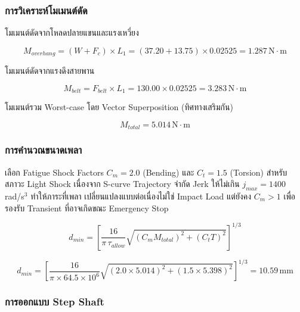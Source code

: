 \subsubsection{การวิเคราะห์โมเมนต์ดัด}

โมเมนต์ดัดจากโหลดปลายแขนและแรงเหวี่ยง

\begin{equation}
  M_{overhang} = (W + F_c) \times L_1
               = (37.20 + 13.75) \times 0.02525
               = 1.287\,\text{N}\cdot\text{m}
  \label{eq:shaft_m_overhang}
\end{equation}

โมเมนต์ดัดจากแรงดึงสายพาน

\begin{equation}
  M_{belt} = F_{belt} \times L_1
           = 130.00 \times 0.02525
           = 3.283\,\text{N}\cdot\text{m}
  \label{eq:shaft_m_belt}
\end{equation}

โมเมนต์รวม Worst-case โดย Vector Superposition (ทิศทางเสริมกัน)

\begin{equation}
  M_{total} = 5.014\,\text{N}\cdot\text{m}
  \label{eq:shaft_m_total}
\end{equation}

\subsubsection{การคำนวณขนาดเพลา}

เลือก Fatigue Shock Factors $C_m = 2.0$ (Bending) และ $C_t = 1.5$ (Torsion)
สำหรับสภาวะ Light Shock เนื่องจาก S-curve Trajectory จำกัด Jerk
ให้ไม่เกิน $j_{max} = 1400$\,rad/s$^3$ ทำให้ภาระที่เพลา
เปลี่ยนแปลงแบบต่อเนื่องไม่ใช่ Impact Load
แต่ยังคง $C_m > 1$ เพื่อรองรับ Transient ที่อาจเกิดขณะ
Emergency Stop

\begin{equation}
  d_{min} = \left[
    \frac{16}{\pi\,\tau_{allow}}
    \sqrt{(C_m M_{total})^2 + (C_t T)^2}
  \right]^{1/3}
  \label{eq:shaft_dmin}
\end{equation}

\begin{equation}
  d_{min} = \left[
    \frac{16}{\pi \times 64.5 \times 10^6}
    \sqrt{(2.0 \times 5.014)^2 + (1.5 \times 5.398)^2}
  \right]^{1/3}
  = 10.59\,\text{mm}
  \label{eq:shaft_result}
\end{equation}

\subsubsection{การออกแบบ Step Shaft}

